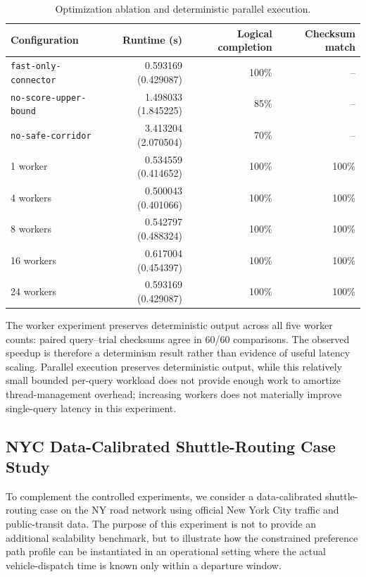 \documentclass[a4paper,fleqn]{cas-dc}
\begin{document}
\begin{table}[t]
\centering
\caption{Optimization ablation and deterministic parallel execution.}
\label{tab:parallel_ablation}
\scriptsize
\setlength{\tabcolsep}{3pt}
\begin{tabular}{@{}lrrr@{}}
\toprule
\textbf{Configuration} & \textbf{Runtime (s)} & \textbf{Logical completion} & \textbf{Checksum match} \\
\midrule
\texttt{fast-only-connector} & 0.593169 (0.429087) & 100\% & -- \\
\texttt{no-score-upper-bound} & 1.498033 (1.845225) & 85\% & -- \\
\texttt{no-safe-corridor} & 3.413204 (2.070504) & 70\% & -- \\
\midrule
1 worker  & 0.534559 (0.414652) & 100\% & 100\% \\
4 workers & 0.500043 (0.401066) & 100\% & 100\% \\
8 workers & 0.542797 (0.488324) & 100\% & 100\% \\
16 workers & 0.617004 (0.454397) & 100\% & 100\% \\
24 workers & 0.593169 (0.429087) & 100\% & 100\% \\
\bottomrule
\end{tabular}
\end{table}

The worker experiment preserves deterministic output across all five worker counts: paired query--trial checksums agree in 60/60 comparisons. The observed speedup is therefore a determinism result rather than evidence of useful latency scaling. Parallel execution preserves deterministic output, while this relatively small bounded per-query workload does not provide enough work to amortize thread-management overhead; increasing workers does not materially improve single-query latency in this experiment.

\subsection{NYC Data-Calibrated Shuttle-Routing Case Study}
\label{subsec:nyc_case_study}

To complement the controlled experiments, we consider a data-calibrated
shuttle-routing case on the NY road network using official New York City
traffic and public-transit data. The purpose of this experiment is not to
provide an additional scalability benchmark, but to illustrate how the
constrained preference path profile can be instantiated in an operational
setting where the actual vehicle-dispatch time is known only within a
departure window.
\end{document}
